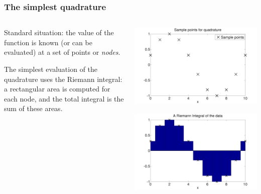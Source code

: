 \documentclass{beamer}
\begin{document}
\begin{frame}
  \frametitle{The simplest quadrature}

  \begin{columns}
    \begin{column}{0.5\textwidth}
      Standard situation: the value of the function is known (or can
      be evaluated) at a set of points or \emph{nodes}. \pause

      \vspace{1ex}

      The simplest evaluation of the quadrature uses the Riemann
      integral: a rectangular area is computed for each node, and the
      total integral is the sum of these areas.
    \end{column}
    \begin{column}{0.5\textwidth}
      \begin{overlayarea}{\textwidth}{0.5\textheight}
        {
          \begin{center}
            \includegraphics[width=\textwidth]{figures/QuadAliasing1}
          \end{center}
        }
        {
          \begin{center}
            \includegraphics[width=\textwidth]{figures/QuadRiemann1}
          \end{center}
        }
      \end{overlayarea}
    \end{column}
  \end{columns}

\end{frame}
\end{document}
